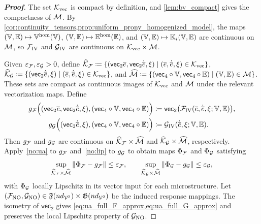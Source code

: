 \begin{proof}[\bf Proof]
The set ${\mathcal{K}}_{\mathrm{vec}}$ is compact by definition, and \cref{lem:bv_compact} gives the compactness of ${\mathcal{M}}$. By \cref{cor:continuity_tensors,prop:uniform_prony_homogenized_model}, the maps $(\mathbb{V},\mathbb{E})\mapsto \mathbb{V}^{\rm hom}(\mathbb{V})$, $(\mathbb{V},\mathbb{E})\mapsto \mathbb{E}^{\rm hom}(\mathbb{E})$, and $(\mathbb{V},\mathbb{E})\mapsto \mathbb{K}_i(\mathbb{V},\mathbb{E})$ are continuous on ${\mathcal{M}}$, so ${\mathcal{F}}_{\mathrm{IV}}$ and ${\mathcal{G}}_{\mathrm{IV}}$ are continuous on ${\mathcal{K}}_{\mathrm{vec}}\times{\mathcal{M}}$.

Given $\varepsilon_{{\mathcal{F}}},\varepsilon_{{\mathcal{G}}}>0$, define $\widehat{{\mathcal{K}}}_{{\mathcal{F}}}\coloneqq
\{(\mathsf{vec}_2\overline e,\mathsf{vec}_2\dot{\overline e},\xi)\mid (\overline e,\dot{\overline e},\xi)\in {\mathcal{K}}_{\mathrm{vec}}\}$,
$\widehat{{\mathcal{K}}}_{{\mathcal{G}}}
\coloneqq
\{(\mathsf{vec}_2\dot{\overline e},\xi)\mid (\overline e,\dot{\overline e},\xi)\in {\mathcal{K}}_{\mathrm{vec}}\}$, and $\widehat{{\mathcal{M}}}\coloneqq
\{(\mathsf{vec}_4\circ\mathbb{V},\mathsf{vec}_4\circ\mathbb{E})\mid (\mathbb{V},\mathbb{E})\in{\mathcal{M}}\}$.
These sets are compact as continuous images of ${\mathcal{K}}_{\mathrm{vec}}$ and ${\mathcal{M}}$ under the relevant vectorization maps. Define
\begin{align*}
g_{{\mathcal{F}}}\Bigl((\mathsf{vec}_2\overline e,\mathsf{vec}_2\dot{\overline e},\xi),(\mathsf{vec}_4\circ\mathbb{V},\mathsf{vec}_4\circ\mathbb{E})\Bigr)
&\coloneqq
\mathsf{vec}_2\bigl({\mathcal{F}}_{\mathrm{IV}}(\overline e,\dot{\overline e},\xi;\mathbb{V},\mathbb{E})\bigr),\\
g_{{\mathcal{G}}}\Bigl((\mathsf{vec}_2\dot{\overline e},\xi),(\mathsf{vec}_4\circ\mathbb{V},\mathsf{vec}_4\circ\mathbb{E})\Bigr)
&\coloneqq
{\mathcal{G}}_{\mathrm{IV}}(\dot{\overline e},\xi;\mathbb{V},\mathbb{E}).
\end{align*}
{Then $g_{{\mathcal{F}}}$ and $g_{{\mathcal{G}}}$ are continuous on $\widehat{{\mathcal{K}}}_{{\mathcal{F}}}\times\widehat{{\mathcal{M}}}$ and $\widehat{{\mathcal{K}}}_{{\mathcal{G}}}\times\widehat{{\mathcal{M}}}$, respectively. Apply~\ref{no:ua} to $g_{{\mathcal{F}}}$ and~\ref{no:lip} to $g_{{\mathcal{G}}}$ to obtain maps $\Phi_{{\mathcal{F}}}$ and $\Phi_{{\mathcal{G}}}$ satisfying
\begin{equation*}
\sup_{\widehat{{\mathcal{K}}}_{{\mathcal{F}}}\times\widehat{{\mathcal{M}}}}\|\Phi_{{\mathcal{F}}}-g_{{\mathcal{F}}}\|\le\varepsilon_{{\mathcal{F}}},\qquad
\sup_{\widehat{{\mathcal{K}}}_{{\mathcal{G}}}\times\widehat{{\mathcal{M}}}}\|\Phi_{{\mathcal{G}}}-g_{{\mathcal{G}}}\|\le\varepsilon_{{\mathcal{G}}},
\end{equation*}
with $\Phi_{{\mathcal{G}}}$ locally Lipschitz in its vector input for each microstructure. Let $({\mathcal{F}}_{\rm NO},{\mathcal{G}}_{\rm NO})\in\mathfrak F(nd_{{\mathcal{V}}^2})\times\mathfrak G(nd_{{\mathcal{V}}^2})$ be the induced response mappings. The isometry of $\mathsf{vec}_2$ gives \cref{eq:ua_full_F_approx,eq:ua_full_G_approx} and preserves the local Lipschitz property of ${\mathcal{G}}_{\rm NO}$.}
\end{proof}

